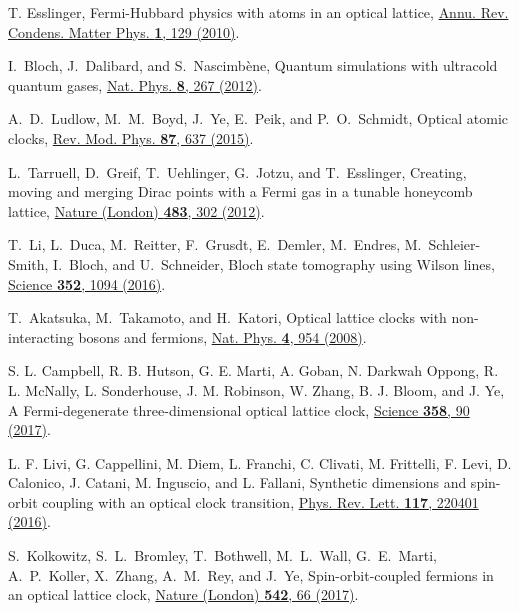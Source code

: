 \documentclass[twocolumn,english,prl,floatfix,citeautoscript,nofootinbib]{revtex4}
\begin{document}
\begin{thebibliography}{999}
 T. Esslinger, Fermi-Hubbard physics with atoms
in an optical lattice, \href{https://doi.org/10.1146/annurev-conmatphys-070909-104059}%
{Annu. Rev. Condens. Matter Phys. \textbf{1}, 129 (2010)}.

 I.~Bloch, J.~Dalibard, and S.~Nascimb\`ene, Quantum
simulations with ultracold quantum gases, \href{https://doi.org/10.1038/nphys2259}%
{Nat. Phys. \textbf{8}, 267 (2012)}.

 A.~D.~Ludlow, M.~M.~Boyd, J.~Ye, E.~Peik, and
P.~O.~Schmidt, Optical atomic clocks, \href{https://doi.org/10.1103/RevModPhys.87.637}%
{Rev. Mod. Phys. \textbf{87}, 637 (2015)}.



 L.~Tarruell, D.~Greif, T.~Uehlinger, G.~Jotzu, and
T.~Esslinger, Creating, moving and merging Dirac points with a Fermi gas in
a tunable honeycomb lattice, \href{https://doi.org/10.1038/nature10871}{%
Nature (London) \textbf{483}, 302 (2012)}.

 T.~Li, L.~Duca, M.~Reitter, F.~Grusdt, E.~Demler,
M.~Endres, M.~Schleier-Smith, I.~Bloch, and U.~Schneider, Bloch state
tomography using Wilson lines, \href{https://doi.org/10.1126/science.aad5812}%
{Science \textbf{352}, 1094 (2016)}.

 T.~Akatsuka, M.~Takamoto, and H.~Katori, Optical lattice
clocks with non-interacting bosons and fermions, \href{https://doi.org/10.1038/nphys1108}%
{Nat. Phys. \textbf{4}, 954 (2008)}.

 S. L. Campbell, R. B. Hutson, G. E. Marti, A. Goban,
N. Darkwah Oppong, R. L. McNally, L. Sonderhouse, J. M. Robinson, W. Zhang,
B. J. Bloom, and J. Ye, A Fermi-degenerate three-dimensional optical lattice
clock, \href{https://doi.org/10.1126/science.aam5538}{Science \textbf{358},
90 (2017)}.

 L. F. Livi, G. Cappellini, M. Diem, L. Franchi, C.
Clivati, M. Frittelli, F. Levi, D. Calonico, J. Catani, M. Inguscio, and L.
Fallani, Synthetic dimensions and spin-orbit coupling with an optical clock
transition, \href{http://doi.org/10.1103/PhysRevLett.117.220401}{Phys. Rev.
Lett. \textbf{117}, 220401 (2016)}.

 S.~Kolkowitz, S.~L.~Bromley, T.~Bothwell, M.~L.~Wall,
G.~E.~Marti, A.~P.~Koller, X.~Zhang, A.~M.~Rey, and J.~Ye,
Spin-orbit-coupled fermions in an optical lattice clock, \href{https://doi.org/10.1038/nature20811}%
{Nature (London) \textbf{542}, 66 (2017)}.


\end{thebibliography}
\end{document}
